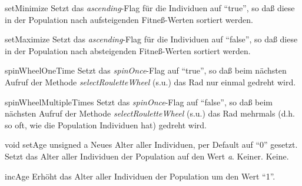 \documentclass{report}
\begin{document}
\setNormalInstance
\printEmptyMethod
{setMinimize}
{Setzt das {\em ascending}-Flag f\"ur die Individuen auf ``true'', so 
 da{\ss} diese in der Population nach aufsteigenden Fitne{\ss}-Werten 
 sortiert werden.}

\vspace{4ex}

\setNormalInstance
\printEmptyMethod
{setMaximize}
{Setzt das {\em ascending}-Flag f\"ur die Individuen auf ``false'', so 
 da{\ss} diese in der 
 Population nach absteigenden Fitne{\ss}-Werten sortiert werden.}

\vspace{4ex}

\setNormalInstance
\printEmptyMethod
{spinWheelOneTime}
{Setzt das {\em spinOnce}-Flag auf ``true'', so da{\ss} beim n\"achsten
 Aufruf der Methode {\em selectRouletteWheel} (s.u.) das Rad nur einmal
 gedreht wird.}

\vspace{4ex}

\setNormalInstance
\printEmptyMethod
{spinWheelMultipleTimes}
{Setzt das {\em spinOnce}-Flag auf ``false'', so da{\ss} beim n\"achsten
 Aufruf der Methode {\em selectRouletteWheel} (s.u.) das Rad mehrmals
 (d.h. so oft, wie die Population Individuen hat) gedreht wird.}

\vspace{4ex}

\setNormalInstance
\printMethodWithOneParam
{void}
{setAge}
{unsigned}
{a}
{Neues Alter aller Individuen, per Default auf ``0'' gesetzt.}
{Setzt das Alter aller Individuen der Population auf den Wert {\em a}.}
{Keiner.}
{Keine.}

\vspace{4ex}

\setNormalInstance
\printEmptyMethod
{incAge}
{Erh\"oht das Alter aller Individuen der Population um den Wert ``1''.}
\end{document}
